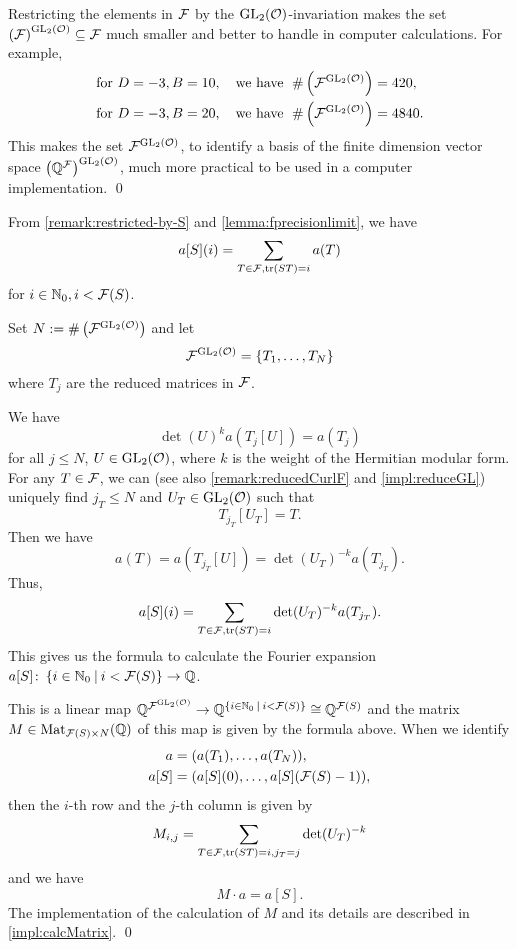 \begin{remark}
Restricting the elements in $\mathcal{F}$ by the $\operatorname{GL}_2(\mathcal{O})$-invariation makes the set ${\left(\mathcal{F}\right)}^{\operatorname{GL}_2(\mathcal{O})} \subseteq \mathcal{F}$ much smaller and better to handle in computer calculations.
For example,
\begin{align*}
& \text{for } D=-3, B=10,\quad \text{we have } \; \# \left({\mathcal{F}}^{\operatorname{GL}_2(\mathcal{O})}\right) = 420, \\
& \text{for } D=-3, B=20,\quad \text{we have } \; \# \left({\mathcal{F}}^{\operatorname{GL}_2(\mathcal{O})}\right) = 4840.
\end{align*}
%
This makes the set ${\mathcal{F}}^{\operatorname{GL}_2(\mathcal{O})}$, to identify a basis of the finite dimension vector space ${\left(\mathbb{Q}^{\mathcal{F}}\right)}^{\operatorname{GL}_2(\mathcal{O})}$, much more practical to be used in a computer implementation.
\qed
\end{remark}

\begin{remark}
\label{remark:how-to-calc-aS}
From \cref{remark:restricted-by-S} and \cref{lemma:fprecisionlimit}, we have
\[ a[S] (i) = \sum_{T \in \mathcal{F}, \textup{\textrm{tr}}(S T) = i} a(T) \]
for $i \in \mathbb{N}_0, i < \mathcal{F}(S)$.

Set $N := \# \left( {\mathcal{F}}^{\operatorname{GL}_2(\mathcal{O})} \right)$ and let
\[ \invarF{\F}{\GL_2(\curlO)} = \Set{T_1, \dots, T_N} \]
where $T_j$ are the reduced matrices in $\mathcal{F}$.

We have
\[ \det(U)^k a(T_j[U]) = a(T_j) \] %
for all $j \le N$, $U \in \operatorname{GL}_2(\mathcal{O})$, where $k$ is the weight of the Hermitian modular form.
For any $T \in \mathcal{F}$, we can (see also \cref{remark:reducedCurlF} and \cref{impl:reduceGL}) uniquely find $j_T \le N$ and $U_T \in \operatorname{GL}_2(\mathcal{O})$ such that
\[ T_{j_T}[U_T] = T. \]
Then we have
\[ a(T) = a(T_{j_T}[U]) = \det(U_T)^{-k} a(T_{j_T}) . \]
Thus,
\[ a[S] (i) =  \sum_{T \in \mathcal{F}, \textup{\textrm{tr}}(S T) = i} \det(U_T)^{-k} a(T_{j_T}) . \]
This gives us the formula to calculate the Fourier expansion $a[S] \colon \Set{i \in \N_0}{i < \FPrecisionLimit{S}} \rightarrow \Q$.

This is a linear map $\Q^{\invarF{\F}{\GL_2(\curlO)}} \rightarrow \Q^{\Set{i \in \N_0}{i < \FPrecisionLimit{S}}} \cong \Q^{\FPrecisionLimit{S}}$ and the matrix $M \in \operatorname{Mat}_{\mathcal{F}(S) \times N}(\mathbb{Q})$ of this map is given by the formula above. When we identify
\begin{align*}
a = & \; (a(T_1), \dots, a(T_N)), \\
a[S] = & \; (a[S](0), \dots, a[S](\mathcal{F}(S) - 1)),
\end{align*}
then the $i$-th row and the $j$-th column is given by
\[ M_{i,j} =  \sum_{T \in \mathcal{F}, \textup{\textrm{tr}}(S T) = i, j_T = j} \det(U_T)^{-k} \]
and we have
\[ M \cdot a = a[S] . \]
The implementation of the calculation of $M$ and its details are described in \cref{impl:calcMatrix}.
\qed
\end{remark}


